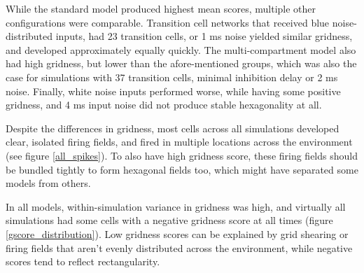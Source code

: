\documentclass{article}
\begin{document}
    While the standard model produced highest mean scores, multiple other configurations were comparable. Transition cell networks that received blue noise-distributed inputs, had 23 transition cells, or 1 ms noise yielded similar gridness, and developed approximately equally quickly. The multi-compartment model also had high gridness, but lower than the afore-mentioned groups, which was also the case for simulations with 37 transition cells, minimal inhibition delay or 2 ms noise. Finally, white noise inputs performed worse, while having some positive gridness, and 4 ms input noise did not produce stable hexagonality at all.
    
    Despite the differences in gridness, most cells across all simulations developed clear, isolated firing fields, and fired in multiple locations across the environment (see figure \ref{all_spikes}). To also have high gridness score, these firing fields should be bundled tightly to form hexagonal fields too, which might have separated some models from others.

    In all models, within-simulation variance in gridness was high, and virtually all simulations had some cells with a negative gridness score at all times (figure \ref{gscore_distribution}). Low gridness scores can be explained by grid shearing or firing fields that aren't evenly distributed across the environment, while negative scores tend to reflect rectangularity.
\end{document}
